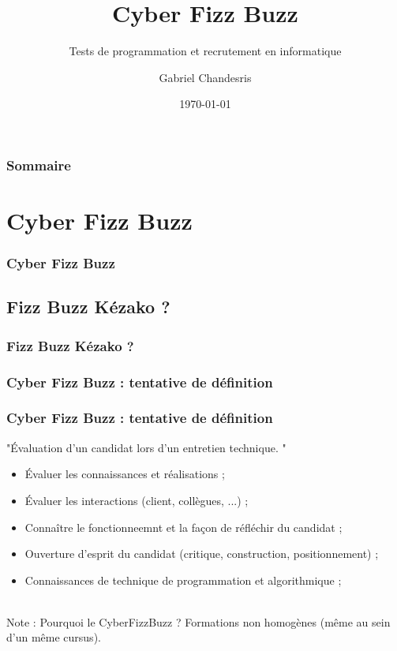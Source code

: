 \documentclass[slidetop,11pt]{beamer}
\title{Cyber Fizz Buzz}
\subtitle{Tests de programmation et recrutement en informatique}
\author{Gabriel Chandesris}
\institute{\emph{to be defined}}
\date{\today} %
\begin{document}
\frame[plain]{\titlepage } 
%


\begin{frame}
	\frametitle{Sommaire}
	\small \tableofcontents[hideallsubsections]
\end{frame} 

\section{Cyber Fizz Buzz}
\begin{frame}
	\frametitle{Cyber Fizz Buzz}
	\tableofcontents[sections=1,currentsection,subsectionstyle=show/shaded/hide] %
\end{frame} 

\subsection{Fizz Buzz K{\'e}zako ?}
\begin{frame}
	\frametitle{Fizz Buzz K{\'e}zako ?}
	\tableofcontents[sections=1,currentsection,subsectionstyle=show/shaded/hide]
\end{frame} 

\subsubsection{Cyber Fizz Buzz : tentative de d{\'e}finition}
\begin{frame}
	\frametitle{Cyber Fizz Buzz : tentative de d{\'e}finition}
	
	"{\'E}valuation d'un candidat lors d'un entretien technique. "~\\
	
	\begin{itemize}
		\item {\'E}valuer les connaissances et r{\'e}alisations ; 
		\item {\'E}valuer les interactions (client, coll{\`e}gues, ...) ; 
		\item Conna{\^i}tre le fonctionneemnt et la fa\c{c}on de r{\'e}fl{\'e}chir du candidat ; 
		\item Ouverture d'esprit du candidat (critique, construction, positionnement) ; 
		\item Connaissances de technique de programmation et algorithmique ; 
	\end{itemize}~\\
	
	Note : Pourquoi le CyberFizzBuzz ? Formations non homog{\`e}nes (m{\^e}me au sein d'un m{\^e}me cursus). 
\end{frame}
\end{document}
